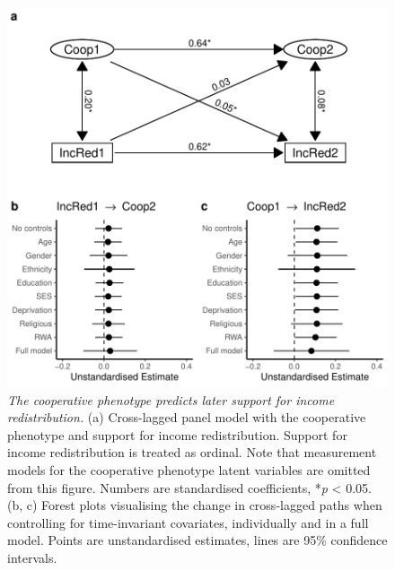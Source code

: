 \documentclass[
  man,floatsintext]{apa6}
\begin{document}
\newpage



\begin{figure}
\centering
\includegraphics{manuscript_files/figure-latex/clpmPlotIncRed-1.pdf}
\caption{\label{fig:clpmPlotIncRed}\emph{The cooperative phenotype predicts later support for income redistribution.} (a) Cross-lagged panel model with the cooperative phenotype and support for income redistribution. Support for income redistribution is treated as ordinal. Note that measurement models for the cooperative phenotype latent variables are omitted from this figure. Numbers are standardised coefficients, *\emph{p} \textless{} 0.05. (b, c) Forest plots visualising the change in cross-lagged paths when controlling for time-invariant covariates, individually and in a full model. Points are unstandardised estimates, lines are 95\% confidence intervals.}
\end{figure}

\newpage
\end{document}
